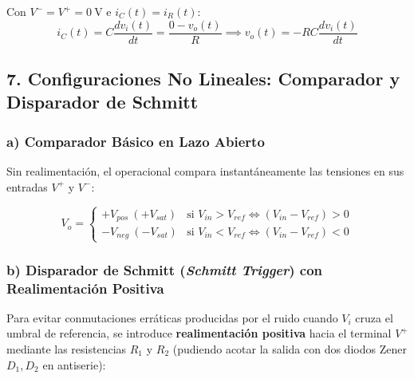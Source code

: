 Con $V^- = V^+ = 0\ \si{\volt}$ e $i_C(t) = i_R(t)$:
\begin{equation}
    i_C(t) = C \frac{dv_i(t)}{dt} = \frac{0 - v_o(t)}{R} \implies \boxed{v_o(t) = -R C \frac{dv_i(t)}{dt}}
\end{equation}

\subsection{7. Configuraciones No Lineales: Comparador y Disparador de Schmitt}

\subsubsection{a) Comparador Básico en Lazo Abierto}
Sin realimentación, el operacional compara instantáneamente las tensiones en sus entradas $V^+$ y $V^-$:

\begin{center}
\end{center}

\begin{equation}
    V_o =
    \begin{cases}
        +V_{pos}\ (+V_{sat}) & \text{si } V_{in} > V_{ref} \iff (V_{in} - V_{ref}) > 0 \\
        -V_{neg}\ (-V_{sat}) & \text{si } V_{in} < V_{ref} \iff (V_{in} - V_{ref}) < 0
    \end{cases}
\end{equation}

\subsubsection{b) Disparador de Schmitt (\textit{Schmitt Trigger}) con Realimentación Positiva}
Para evitar conmutaciones erráticas producidas por el ruido cuando $V_i$ cruza el umbral de referencia, se introduce \textbf{realimentación positiva} hacia el terminal $V^+$ mediante las resistencias $R_1$ y $R_2$ (pudiendo acotar la salida con dos diodos Zener $D_1, D_2$ en antiserie):

